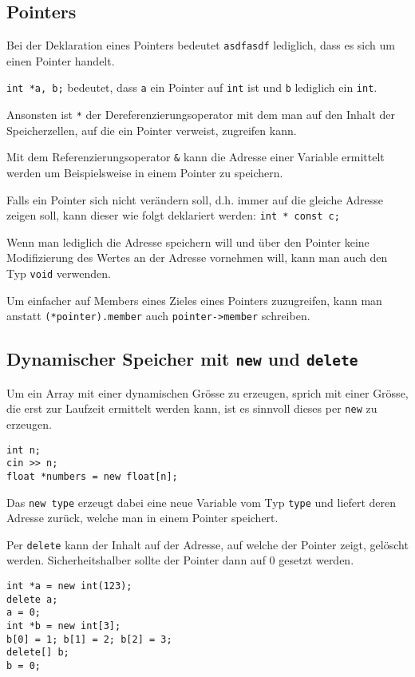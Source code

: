\documentclass{article}
\newenvironment{code}
	{\begin{shaded}\vspace{-2.2mm}} 
	{\vspace{-5.0mm}\end{shaded}}
\begin{document}
\begin{multicols*}{3}
		\subsection{Pointers} %
			Bei der Deklaration eines Pointers bedeutet \lstinline!asdfasdf! lediglich, dass es sich um einen Pointer handelt.
			
			\lstinline!int *a, b;! bedeutet, dass \lstinline!a! ein Pointer auf \lstinline!int! ist und \lstinline!b! lediglich ein \lstinline!int!.
			
			Ansonsten ist \lstinline!*! der Dereferenzierungsoperator mit dem man auf den 
			Inhalt der Speicherzellen, auf die ein Pointer verweist, zugreifen kann.
			
			Mit dem Referenzierungsoperator \lstinline!&! kann die Adresse einer Variable ermittelt werden um Beispielsweise in einem Pointer zu speichern.
			
			Falls ein Pointer sich nicht verändern soll, d.h. immer auf die gleiche Adresse zeigen soll, kann dieser wie folgt deklariert werden:
			\lstinline!int * const c;!
			
			Wenn man lediglich die Adresse speichern will und über den Pointer keine Modifizierung des Wertes an der Adresse vornehmen will, kann man auch den Typ \lstinline!void! verwenden.
			
			Um einfacher auf Members eines Zieles eines Pointers zuzugreifen, kann man anstatt \lstinline!(*pointer).member! auch \lstinline!pointer->member! schreiben.
		\subsection{Dynamischer Speicher mit \lstinline!new! und \lstinline!delete!} %
			Um ein Array mit einer dynamischen Grösse zu erzeugen, sprich mit einer Grösse, die erst zur Laufzeit ermittelt werden kann, ist es sinnvoll dieses per \lstinline!new! zu erzeugen.
			\begin{code}
				\begin{lstlisting}[style=list]
int n;
cin >> n;
float *numbers = new float[n];
				\end{lstlisting}
			\end{code}
			Das \lstinline!new type! erzeugt dabei eine neue Variable vom Typ \lstinline!type! und liefert deren Adresse zurück, welche man in einem Pointer speichert.
			
			Per \lstinline!delete! kann der Inhalt auf der Adresse, auf welche der Pointer zeigt, gelöscht werden.
			Sicherheitshalber sollte der Pointer dann auf 0 gesetzt werden.
			\begin{code}
				\begin{lstlisting}[style=list]
int *a = new int(123);
delete a;
a = 0;
int *b = new int[3];
b[0] = 1; b[1] = 2; b[2] = 3;
delete[] b;
b = 0;
				\end{lstlisting}
			\end{code}

\end{multicols*}
\end{document}
